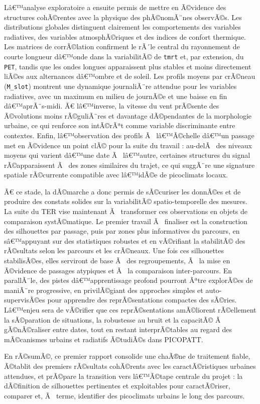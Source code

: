 \documentclass{article}
\begin{document}
Lâ€™analyse exploratoire a ensuite permis de mettre en Ã©vidence des structures cohÃ©rentes avec la physique des phÃ©nomÃ¨nes observÃ©s. Les distributions globales distinguent clairement les comportements des variables radiatives, des variables atmosphÃ©riques et des indices de confort thermique. Les matrices de corrÃ©lation confirment le rÃ´le central du rayonnement de courte longueur dâ€™onde dans la variabilitÃ© de \texttt{tmrt} et, par extension, du \texttt{PET}, tandis que les ondes longues apparaissent plus stables et moins directement liÃ©es aux alternances dâ€™ombre et de soleil. Les profils moyens par crÃ©neau (\texttt{M\_slot}) montrent une dynamique journaliÃ¨re attendue pour les variables radiatives, avec un maximum en milieu de journÃ©e et une baisse en fin dâ€™aprÃ¨s-midi. Ã€ lâ€™inverse, la vitesse du vent prÃ©sente des Ã©volutions moins rÃ©guliÃ¨res et davantage dÃ©pendantes de la morphologie urbaine, ce qui renforce son intÃ©rÃªt comme variable discriminante entre contextes. Enfin, lâ€™observation des profils Ã  lâ€™Ã©chelle dâ€™un passage met en Ã©vidence un point clÃ© pour la suite du travail : au-delÃ  des niveaux moyens qui varient dâ€™une date Ã  lâ€™autre, certaines structures du signal rÃ©apparaissent Ã  des zones similaires du trajet, ce qui suggÃ¨re une signature spatiale rÃ©currente compatible avec lâ€™idÃ©e de picoclimats locaux.

\medskip
Ã€ ce stade, la dÃ©marche a donc permis de sÃ©curiser les donnÃ©es et de produire des constats solides sur la variabilitÃ© spatio-temporelle des mesures. La suite du TER vise maintenant Ã  transformer ces observations en objets de comparaison systÃ©matique. Le premier travail Ã  finaliser est la construction des silhouettes par passage, puis par zones plus informatives du parcours, en sâ€™appuyant sur des statistiques robustes et en vÃ©rifiant la stabilitÃ© des rÃ©sultats selon les parcours et les crÃ©neaux. Une fois ces silhouettes stabilisÃ©es, elles serviront de base Ã  des regroupements, Ã  la mise en Ã©vidence de passages atypiques et Ã  la comparaison inter-parcours. En parallÃ¨le, des pistes dâ€™apprentissage profond pourront Ãªtre explorÃ©es de maniÃ¨re progressive, en privilÃ©giant des approches simples et auto-supervisÃ©es pour apprendre des reprÃ©sentations compactes des sÃ©ries. Lâ€™enjeu sera de vÃ©rifier que ces reprÃ©sentations amÃ©liorent rÃ©ellement la sÃ©paration de situations, la robustesse au bruit et la capacitÃ© Ã  gÃ©nÃ©raliser entre dates, tout en restant interprÃ©tables au regard des mÃ©canismes urbains et radiatifs Ã©tudiÃ©s dans PICOPATT.

\medskip
En rÃ©sumÃ©, ce premier rapport consolide une chaÃ®ne de traitement fiable, Ã©tablit des premiers rÃ©sultats cohÃ©rents avec les caractÃ©ristiques urbaines attendues, et prÃ©pare la transition vers lâ€™Ã©tape centrale du projet : la dÃ©finition de silhouettes pertinentes et exploitables pour caractÃ©riser, comparer et, Ã  terme, identifier des picoclimats urbains le long des parcours.


\newpage
\printbibliography
\end{document}
